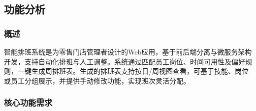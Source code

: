 \documentclass{ctexart}
\begin{document}
\subsection{功能分析}
\subsubsection{概述}

智能排班系统是为零售门店管理者设计的Web应用，基于前后端分离与微服务架构开发，支持自动化排班与人工调整。系统通过匹配员工岗位、时间可用性及偏好规则，一键生成周排班表。生成的排班表支持按日/周视图查看，可基于技能、岗位或员工分组展示，并提供手动修改功能，实现班次灵活分配。

\subsubsection{核心功能需求}
\end{document}

